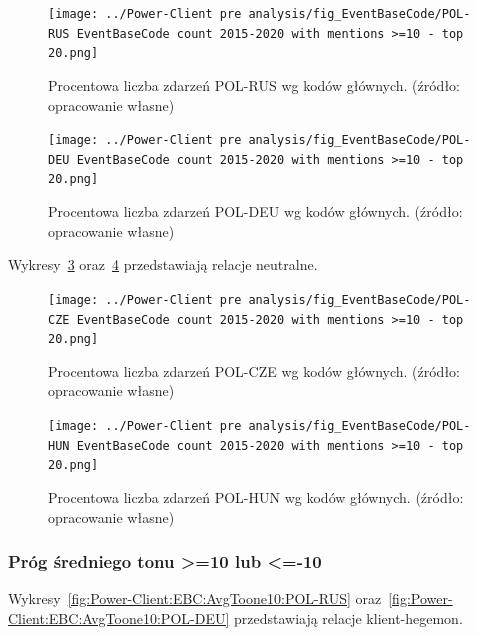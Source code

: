 \documentclass[11pt]{report}
\begin{document}
    \begin{figure}[tp]
        \centering
        \texttt{[image: ../Power-Client pre analysis/fig\_EventBaseCode/POL-RUS EventBaseCode count 2015-2020 with mentions >=10 - top 20.png]}
        \caption{Procentowa liczba zdarzeń POL-RUS wg kodów głównych. (źródło: opracowanie własne)}
        \label{fig:Power-Client:EBC:Mentions10:POL-RUS}
    \end{figure}

    \begin{figure}[tp]
        \centering
        \texttt{[image: ../Power-Client pre analysis/fig\_EventBaseCode/POL-DEU EventBaseCode count 2015-2020 with mentions >=10 - top 20.png]}
        \caption{Procentowa liczba zdarzeń POL-DEU wg kodów głównych. (źródło: opracowanie własne)}
        \label{fig:Power-Client:EBC:Mentions10:POL-DEU}
    \end{figure}

    Wykresy~\ref{fig:Power-Client:EBC:Mentions10:POL-CZE} oraz~\ref{fig:Power-Client:EBC:Mentions10:POL-HUN} przedstawiają relacje neutralne.

    \begin{figure}[tp]
        \centering
        \texttt{[image: ../Power-Client pre analysis/fig\_EventBaseCode/POL-CZE EventBaseCode count 2015-2020 with mentions >=10 - top 20.png]}
        \caption{Procentowa liczba zdarzeń POL-CZE wg kodów głównych. (źródło: opracowanie własne)}
        \label{fig:Power-Client:EBC:Mentions10:POL-CZE}
    \end{figure}

    \begin{figure}[tp]
        \centering
        \texttt{[image: ../Power-Client pre analysis/fig\_EventBaseCode/POL-HUN EventBaseCode count 2015-2020 with mentions >=10 - top 20.png]}
        \caption{Procentowa liczba zdarzeń POL-HUN wg kodów głównych. (źródło: opracowanie własne)}
        \label{fig:Power-Client:EBC:Mentions10:POL-HUN}
    \end{figure}

    \subsubsection{Próg średniego tonu >=10 lub <=-10}\label{subsubsec:ebc:próg-średniego-tonu->=10-lub-<=-10}

    Wykresy~\ref{fig:Power-Client:EBC:AvgToone10:POL-RUS} oraz~\ref{fig:Power-Client:EBC:AvgToone10:POL-DEU} przedstawiają relacje klient-hegemon.
\end{document}
